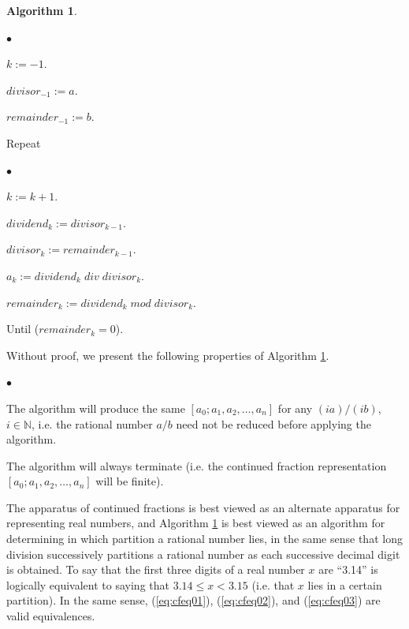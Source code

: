 \documentclass{esub2acm}
\newtheorem{algorithm}{Algorithm}
\newcommand{\intsetpos}{{\mathbb{N}}}
\newenvironment{alglvl0}{\begin{list}
               {$\bullet$}{\setlength{\labelwidth}{3mm}\setlength{\leftmargin}{6mm}}}
               {\end{list}}
\newenvironment{alglvl1}{\begin{list}
               {$\bullet$}{\setlength{\labelwidth}{3mm}\setlength{\leftmargin}{6mm}}}
               {\end{list}}
\newenvironment{propenum}{\begin{list}
               {$\bullet$}{\setlength{\labelwidth}{3mm}\setlength{\leftmargin}{6mm}}}
               {\end{list}}
\begin{document}
\begin{algorithm}\label{alg:akgenalg}\end{algorithm}
\begin{alglvl0}
\item $k:=-1$.
\item $divisor_{-1} := a$.
\item $remainder_{-1} := b$.

\item Repeat

\begin{alglvl1}
\item $k := k + 1$.
\item $dividend_k := divisor_{k-1}$.
\item $divisor_k  := remainder_{k-1}$.
\item $a_k :=  dividend_k \; div \; divisor_k$.
\item $remainder_k := dividend_k \; mod \; divisor_k$.
\end{alglvl1}

\item Until ($remainder_k = 0$).
\end{alglvl0}

Without proof, we present the following properties of
Algorithm \ref{alg:akgenalg}.

\begin{propenum}
\item  The algorithm will produce the same $[a_{0};a_{1},a_{2},\ldots{} ,a_{n}]$
       for any $(ia)/(ib)$, $i \in \intsetpos{}$, i.e.
       the rational number $a/b$ need not be reduced before
       applying the algorithm.
\item  The algorithm will always terminate (i.e. the
       continued fraction representation
       $[a_{0};a_{1},a_{2},\ldots{} ,a_{n}]$ will be
       finite).
\end{propenum}

The apparatus of continued fractions is best viewed as
an alternate apparatus for representing real numbers, and
Algorithm \ref{alg:akgenalg} is best viewed as an algorithm for
determining in which partition a rational number lies, in the same sense
that long division successively partitions a rational number as each
successive decimal digit is obtained.  To say that
the first three digits of a real number $x$ are ``3.14'' is logically equivalent
to saying that $3.14 \leq x < 3.15$ (i.e. that $x$ lies in a certain
partition).  In the same sense, (\ref{eq:cfeq01}), (\ref{eq:cfeq02}),
and (\ref{eq:cfeq03}) are valid equivalences.
\end{document}
